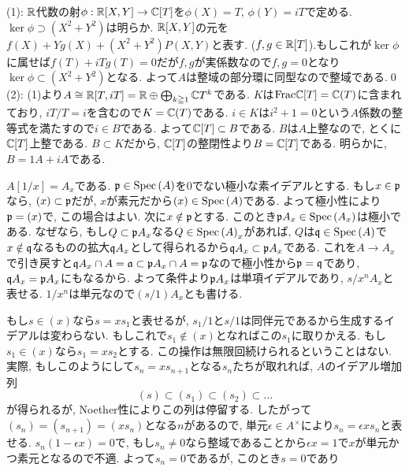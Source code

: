 {\begin{probans}
(1): $\mathbb{R}$代数の射$\phi:\mathbb{R}[X,Y]\to \mathbb{C}[T]$を$\phi(X) = T$, $\phi(Y) = iT$で定める. $\ker{\phi} \supset (X^2+Y^2)$は明らか. $\mathbb{R}[X,Y]$の元を$f(X) + Yg(X) + (X^2+Y^2)P(X,Y)$と表す. ($f,g\in \mathbb{R}[T]$).もしこれが$\ker{\phi}$に属せば$f(T) + iTg(T) = 0$だが$f,g$が実係数なので$f,g=0$となり$\ker{\phi}\subset (X^2+Y^2)$となる. よって$A$は整域の部分環に同型なので整域である.\qed \\
(2): (1)より$A\cong \mathbb{R}[T,iT] = \mathbb{R}\oplus \bigoplus_{k\geqq 1} \mathbb{C}T^k$である. $K$は$\mathrm{Frac}\mathbb{C}[T] = \mathbb{C}(T)$に含まれており, $iT/T = i$を含むので$K=\mathbb{C}(T)$である. $i\in K$は$i^2 + 1 = 0$という$A$係数の整等式を満たすので$i\in B$である. よって$\mathbb{C}[T]\subset B$である. $B$は$A$上整なので, とくに$\mathbb{C}[T]$上整である. $B\subset K$だから, $\mathbb{C}[T]$の整閉性より$B=\mathbb{C}[T]$である. 明らかに, $B=1A + iA$である.
\end{probans}
\begin{probans}
$A[1/x] = A_x$である. $\mathfrak{p}\in \mathrm{Spec}\left( A \right)$を0でない極小な素イデアルとする. もし$x\in \mathfrak{p}$なら, $(x)\subset \mathfrak{p}$だが, $x$が素元だから$(x)\in \mathrm{Spec}\left( A \right)$である. よって極小性により$\mathfrak{p}=(x)$で, この場合はよい. 次に$x\notin \mathfrak{p}$とする. このとき$\mathfrak{p}A_{x} \in \mathrm{Spec}\left( A_x \right)$は極小である. なぜなら, もし$Q \subset \mathfrak{p}A_{x}$なる$Q\in \mathrm{Spec}\left( A \right)_{x}$があれば, $Q$は$\mathfrak{q}\in \mathrm{Spec}\left( A \right)$で$x\notin \mathfrak{q}$なるものの拡大$\mathfrak{q}A_x$として得られるから$\mathfrak{q}A_{x} \subset \mathfrak{p}A_{x}$である. これを$A\to A_{x}$で引き戻すと$\mathfrak{q}A_x\cap A = \mathfrak{a} \subset \mathfrak{p}A_{x} \cap A = \mathfrak{p}$なので極小性から$\mathfrak{p}=\mathfrak{q}$であり, $\mathfrak{q}A_x = \mathfrak{p}A_{x}$にもなるから. よって条件より$\mathfrak{p}A_x$は単項イデアルであり, $s/x^n A_{x}$と表せる. $1/x^n$は単元なので$(s/1) A_{x}$とも書ける. \par
{} もし$s\in (x)$なら$s=xs_1$と表せるが, $s_1/1$と$s/1$は同伴元であるから生成するイデアルは変わらない. もしこれで$s_1\notin (x)$となればこの$s_1$に取りかえる. もし$s_1\in (x)$なら$s_1 = xs_2$とする. この操作は無限回続けられるということはない. 実際, もしこのようにして$s_n = xs_{n+1}$となる$s_n$たちが取れれば, $A$のイデアル増加列
\[(s) \subset (s_1) \subset (s_2) \subset \dots\]
が得られるが, Noether性によりこの列は停留する. したがって$(s_n) = (s_{n+1}) = (xs_{n})$となる$n$があるので, 単元$\epsilon\in A^{\times}$により$s_{n} = \epsilon xs_n$と表せる. $s_n(1-\epsilon x) = 0$で, もし$s_n \neq 0$なら整域であることから$\epsilon x = 1$で$x$が単元かつ素元となるので不適. よって$s_n = 0$であるが, このとき$s=0$であり

\end{probans}}
